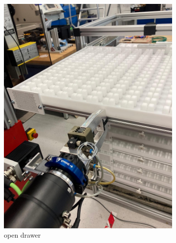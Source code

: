 \begin{figure}[h]
\begin{subfigure}[b]{0.32\textwidth}
        \includegraphics[width=\textwidth]{figures/shelf-control/open-drawer.jpeg}
        \caption{open drawer}
        \vspace{0.45cm}
        \label{fig:open-drawer}
    \end{subfigure}\hspace{0.1cm}
    \vspace{0.75cm}
    \begin{subfigure}[b]{0.32\textwidth}
        \centering

\end{subfigure}
\end{figure}
